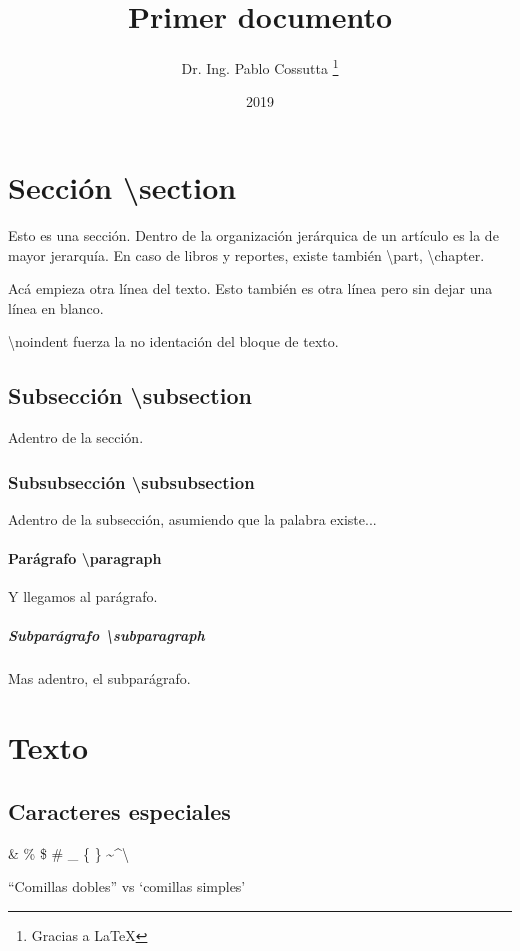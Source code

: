 \documentclass[11pt, a4paper]{article}
\title{Primer documento}
\author{Dr. Ing. Pablo Cossutta \thanks{Gracias a \LaTeX}}
\date{2019}
\begin{document}
\maketitle
\section{Sección \textbackslash section} \label{sec1}
Esto es una sección. Dentro de la organización jerárquica de un artículo es la de mayor jerarquía. En caso de libros y reportes, existe también \textbackslash part, \textbackslash chapter.

Acá empieza otra línea del texto.
Esto también es otra línea pero sin dejar una línea en blanco.

\noindent \textbackslash noindent fuerza la no identación del bloque de texto.

\subsection{Subsección \textbackslash subsection}
Adentro de la sección. 

\subsubsection{Subsubsección \textbackslash subsubsection}
Adentro de la subsección, asumiendo que la palabra existe...

\paragraph{Parágrafo \textbackslash paragraph}
Y llegamos al parágrafo.
\subparagraph{Subparágrafo \textbackslash subparagraph}
Mas adentro, el subparágrafo.

\section{Texto}
\subsection{Caracteres especiales}
\& \% \$ \# \_ \{ \} \textasciitilde \textasciicircum \textbackslash

``Comillas dobles'' vs `comillas simples'
\end{document}
